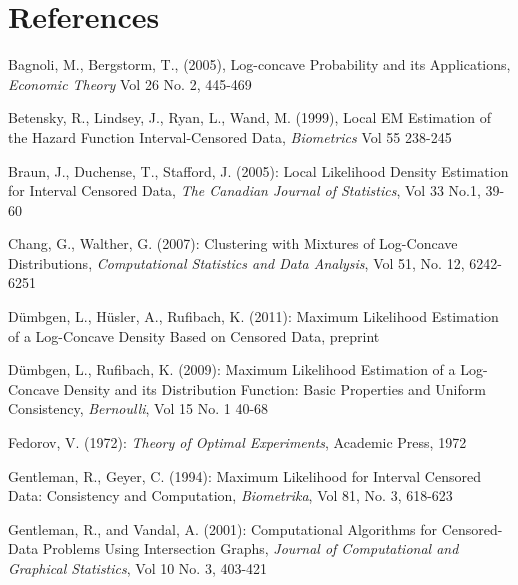 \documentclass[12pt]{article}
\numberwithin{equation}{section}
\begin{document}
	
{\section{References} }

Bagnoli, M., Bergstorm, T., (2005), Log-concave Probability and its Applications, \emph{Economic Theory} Vol 26 No. 2, 445-469

\vspace{3mm}

Betensky, R., Lindsey, J., Ryan, L., Wand, M. (1999), Local EM Estimation of the Hazard Function Interval-Censored Data, \emph{Biometrics} Vol 55 238-245

\vspace{3mm}

Braun, J., Duchense, T., Stafford, J. (2005): Local Likelihood Density Estimation for Interval Censored Data, \emph{The Canadian Journal of Statistics}, Vol 33 No.1, 39-60

\vspace{3mm}

Chang, G., Walther, G. (2007): Clustering with Mixtures of Log-Concave Distributions, \emph{Computational Statistics and Data Analysis}, Vol 51, No. 12, 6242-6251

\vspace{3mm}

D\"umbgen, L., H\"usler, A., Rufibach, K. (2011): Maximum Likelihood Estimation of a Log-Concave Density Based on Censored Data, preprint

\vspace{3mm}

D\"umbgen, L., Rufibach, K. (2009): Maximum Likelihood Estimation of a Log-Concave Density and its Distribution Function: Basic Properties and Uniform Consistency, \emph{Bernoulli}, Vol 15 No. 1 40-68

\vspace{3mm} 

Fedorov, V. (1972): \emph{Theory of Optimal Experiments}, Academic Press, 1972 

\vspace{3mm}

Gentleman, R., Geyer, C. (1994): Maximum Likelihood for Interval Censored Data: Consistency and Computation, \emph{Biometrika}, Vol 81, No. 3, 618-623

\vspace{3mm}

Gentleman, R., and Vandal, A. (2001): Computational Algorithms for Censored-Data Problems Using Intersection Graphs, \emph{Journal of Computational and Graphical Statistics}, Vol 10 No. 3, 403-421
\end{document}
